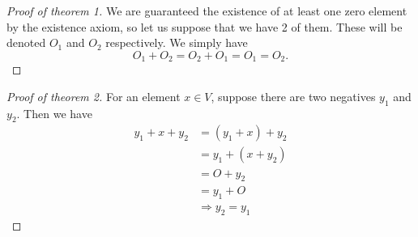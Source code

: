 \documentclass[main.tex]{subfiles}
\begin{document}
    \begin{proof}[Proof of theorem 1]
        We are guaranteed the existence of at least one zero element by the existence axiom, so let us suppose that we have 2 of them.
        These will be denoted $O_1$ and $O_2$ respectively. 
        We simply have $$O_1 + O_2 = O_2 + O_1 = O_1 = O_2.$$
    \end{proof}
    \begin{proof}[Proof of theorem 2]
        For an element $x \in V$, suppose there are two negatives $y_1$ and $y_2$. 
        Then we have
        \begin{align*}
            y_1 + x + y_2 &= (y_1 + x) + y_2 \\
            &= y_1 + (x + y_2) \\
            &= O + y_2 \\
            &= y_1 + O \\
            &\Rightarrow y_2 = y_1 
        \end{align*}
    \end{proof}
\end{document}
